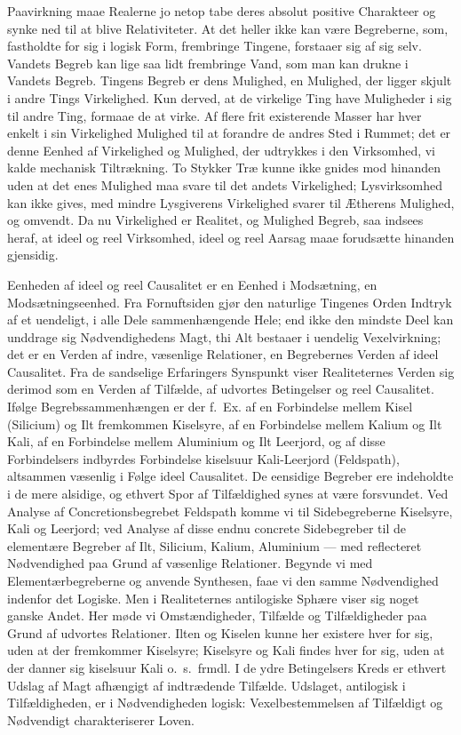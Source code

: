 \documentclass[12pt]{article}
\newcommand{\opage}[1]{\marginnote{\footnotesize\textit{[#1]}}}
\begin{document}
\opage{46} Paavirkning maae Realerne jo netop tabe deres absolut positive
Charakteer og synke ned til at blive Relativiteter. At det heller
ikke kan være Begreberne, som, fastholdte for sig i logisk Form,
frembringe Tingene, forstaaer sig af sig selv. Vandets Begreb kan
lige saa lidt frembringe Vand, som man kan drukne i Vandets Begreb.
Tingens Begreb er dens Mulighed, en Mulighed, der ligger skjult i
andre Tings Virkelighed. Kun derved, at de virkelige Ting have
Muligheder i sig til andre Ting, formaae de at virke. Af flere frit
existerende Masser har hver enkelt i sin Virkelighed Mulighed til at
forandre de andres Sted i Rummet; det er denne Eenhed af Virkelighed
og Mulighed, der udtrykkes i den Virksomhed, vi kalde mechanisk
Tiltrækning. To Stykker Træ kunne ikke gnides mod hinanden uden at
det enes Mulighed maa svare til det andets Virkelighed;
Lysvirksomhed kan ikke gives, med mindre Lysgiverens Virkelighed
svarer til Ætherens Mulighed, og omvendt. Da nu Virkelighed er
Realitet, og Mulighed Begreb, saa indsees heraf, at ideel og reel
Virksomhed, ideel og reel Aarsag maae forudsætte hinanden gjensidig.

Eenheden af ideel og reel Causalitet er en Eenhed i Modsætning, en
Modsætningseenhed. Fra Fornuftsiden gjør den naturlige Tingenes
Orden Indtryk af et uendeligt, i alle Dele sammenhængende Hele; end
ikke den mindste Deel kan unddrage sig Nødvendighedens Magt, thi Alt
bestaaer i uendelig Vexelvirkning; det er en Verden af indre,
væsenlige Relationer, en Begrebernes Verden af ideel Causalitet. Fra
de sandselige Erfaringers Synspunkt viser Realiteternes Verden sig
derimod som en Verden af Tilfælde, af udvortes Betingelser og reel
Causalitet. Ifølge Begrebssammenhængen er der f.\ Ex. af en
\opage{47} Forbindelse mellem Kisel (Silicium) og Ilt fremkommen Kiselsyre, af
en Forbindelse mellem Kalium og Ilt Kali, af en Forbindelse mellem
Aluminium og Ilt Leerjord, og af disse Forbindelsers indbyrdes
Forbindelse kiselsuur Kali-Leerjord (Feldspath), altsammen væsenlig
i Følge ideel Causalitet. De eensidige Begreber ere indeholdte i de
mere alsidige, og ethvert Spor af Tilfældighed synes at være
forsvundet. Ved Analyse af Concretionsbegrebet Feldspath komme vi
til Sidebegreberne Kiselsyre, Kali og Leerjord; ved Analyse af disse
endnu concrete Sidebegreber til de elementære Begreber af Ilt,
Silicium, Kalium, Aluminium --- med reflecteret Nødvendighed paa
Grund af væsenlige Relationer. Begynde vi med Elementærbegreberne og
anvende Synthesen, faae vi den samme Nødvendighed indenfor det
Logiske. Men i Realiteternes antilogiske Sphære viser sig noget
ganske Andet. Her møde vi Omstændigheder, Tilfælde og Tilfældigheder
paa Grund af udvortes Relationer. Ilten og Kiselen kunne her
existere hver for sig, uden at der fremkommer Kiselsyre; Kiselsyre
og Kali findes hver for sig, uden at der danner sig kiselsuur Kali
o.\ s.\ frmdl. I de ydre Betingelsers Kreds er ethvert Udslag af
Magt afhængigt af indtrædende Tilfælde. Udslaget, antilogisk i
Tilfældigheden, er i Nødvendigheden logisk: Vexelbestemmelsen af
Tilfældigt og Nødvendigt charakteriserer Loven.
\end{document}
